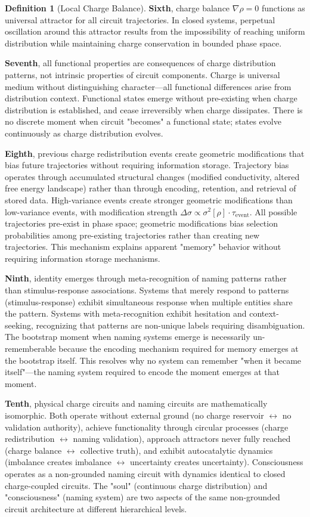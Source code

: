 \documentclass[12pt,a4paper]{article}
\theoremstyle{plain}
\theoremstyle{definition}
\newtheorem{definition}[theorem]{Definition}
\theoremstyle{remark}
\begin{document}
\begin{definition}[Local Charge Balance]
\textbf{Sixth}, charge balance $\nabla \rho = 0$ functions as universal attractor for all circuit trajectories. In closed systems, perpetual oscillation around this attractor results from the impossibility of reaching uniform distribution while maintaining charge conservation in bounded phase space.

\textbf{Seventh}, all functional properties are consequences of charge distribution patterns, not intrinsic properties of circuit components. Charge is universal medium without distinguishing character—all functional differences arise from distribution context. Functional states emerge without pre-existing when charge distribution is established, and cease irreversibly when charge dissipates. There is no discrete moment when circuit "becomes" a functional state; states evolve continuously as charge distribution evolves.

\textbf{Eighth}, previous charge redistribution events create geometric modifications that bias future trajectories without requiring information storage. Trajectory bias operates through accumulated structural changes (modified conductivity, altered free energy landscape) rather than through encoding, retention, and retrieval of stored data. High-variance events create stronger geometric modifications than low-variance events, with modification strength $\Delta \sigma \propto \sigma^2[\rho] \cdot \tau_{\text{event}}$. All possible trajectories pre-exist in phase space; geometric modifications bias selection probabilities among pre-existing trajectories rather than creating new trajectories. This mechanism explains apparent "memory" behavior without requiring information storage mechanisms.

\textbf{Ninth}, identity emerges through meta-recognition of naming patterns rather than stimulus-response associations. Systems that merely respond to patterns (stimulus-response) exhibit simultaneous response when multiple entities share the pattern. Systems with meta-recognition exhibit hesitation and context-seeking, recognizing that patterns are non-unique labels requiring disambiguation. The bootstrap moment when naming systems emerge is necessarily un-rememberable because the encoding mechanism required for memory emerges at the bootstrap itself. This resolves why no system can remember "when it became itself"—the naming system required to encode the moment emerges at that moment.

\textbf{Tenth}, physical charge circuits and naming circuits are mathematically isomorphic. Both operate without external ground (no charge reservoir $\leftrightarrow$ no validation authority), achieve functionality through circular processes (charge redistribution $\leftrightarrow$ naming validation), approach attractors never fully reached (charge balance $\leftrightarrow$ collective truth), and exhibit autocatalytic dynamics (imbalance creates imbalance $\leftrightarrow$ uncertainty creates uncertainty). Consciousness operates as a non-grounded naming circuit with dynamics identical to closed charge-coupled circuits. The "soul" (continuous charge distribution) and "consciousness" (naming system) are two aspects of the same non-grounded circuit architecture at different hierarchical levels.


\end{definition}
\end{document}
